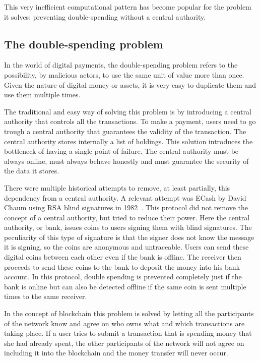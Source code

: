 This very inefficient computational pattern has become popular for the problem it solves: preventing double-spending without a central authority. 

\subsection{The double-spending problem}

In the world of digital payments, the double-spending problem refers to the possibility, by malicious actors, to use the same unit of value more than once. Given the nature of digital money or assets, it is very easy to duplicate them and use them multiple times.

The traditional and easy way of solving this problem is by introducing a central authority that controls all the transactions. To make a payment, users need to go trough a central authority that guarantees the validity of the transaction. The central authority stores internally a list of holdings. This solution introduces the bottleneck of having a single point of failure. The central authority must be always online, must always behave honestly and must guarantee the security of the data it stores. 

There were multiple historical attempts to remove, at least partially, this dependency from a central authority. A relevant attempt was ECash by David Chaum using RSA blind signatures in 1982~\cite{blind-signatures}. This protocol did not remove the concept of a central authority, but tried to reduce their power. Here the central authority, or bank, issues coins to users signing them with blind signatures. The peculiarity of this type of signature is that the signer does not know the message it is signing, so the coins are anonymous and untraceable. Users can send these digital coins between each other even if the bank is offline. The receiver then proceeds to send these coins to the bank to deposit the money into his bank account. In this protocol, double spending is prevented completely just if the bank is online but can also be detected offline if the same coin is sent multiple times to the same receiver.

In the concept of blockchain this problem is solved by letting all the participants of the network know and agree on who owns what and which transactions are taking place. If a user tries to submit a transaction that is spending money that she had already spent, the other participants of the network will not agree on including it into the blockchain and the money transfer will never occur.


